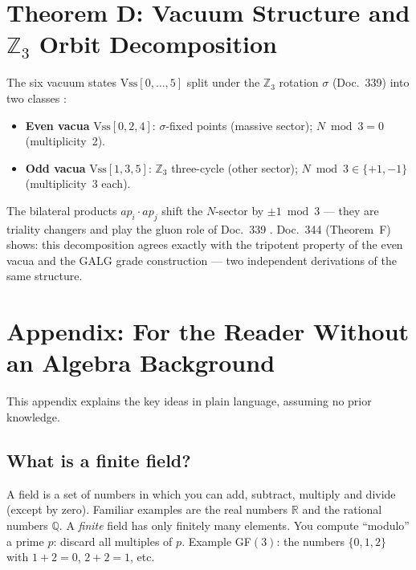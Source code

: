 \section{Theorem D: Vacuum Structure and $\mathbb{Z}_3$ Orbit Decomposition}

The six vacuum states $\mathrm{Vss}[0,\ldots,5]$ split under the $\mathbb{Z}_3$
rotation $\sigma$ (Doc.~339) into two classes \BM:

\begin{itemize}
\item \textbf{Even vacua} $\mathrm{Vss}[0,2,4]$: $\sigma$-fixed points
      (massive sector); $N \bmod 3 = 0$ (multiplicity~2).
\item \textbf{Odd vacua} $\mathrm{Vss}[1,3,5]$: $\mathbb{Z}_3$ three-cycle
      (other sector); $N \bmod 3 \in \{+1,-1\}$ (multiplicity~3 each).
\end{itemize}

The bilateral products $ap_i \cdot ap_j$ shift the $N$-sector by
$\pm 1 \bmod 3$ --- they are triality changers and play the gluon role of
Doc.~339 \BM. Doc.~344 (Theorem~F) shows: this decomposition agrees exactly with
the tripotent property of the even vacua and the GALG grade construction ---
two independent derivations of the same structure.


\section*{Appendix: For the Reader Without an Algebra Background}

This appendix explains the key ideas in plain language, assuming no prior knowledge.

\subsection*{What is a finite field?}

A field is a set of numbers in which you can add, subtract, multiply and
divide (except by zero). Familiar examples are the real numbers $\mathbb{R}$
and the rational numbers $\mathbb{Q}$.
A \emph{finite} field has only finitely many elements.
You compute ``modulo'' a prime $p$: discard all multiples of $p$.
Example GF$(3)$: the numbers $\{0,1,2\}$ with $1+2 = 0$, $2+2 = 1$, etc.

